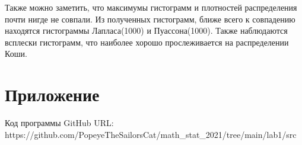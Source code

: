\documentclass[a4paper]{article}
\begin{document}
 
Также можно заметить, что максимумы гистограмм и плотностей распределения почти нигде не совпали. Из полученных гистограмм, ближе всего к совпадению находятся гистограммы Лапласа(1000) и Пуассона(1000). Также наблюдаются всплески гистограмм, что наиболее хорошо прослеживается на распределении Коши. 

\section{Приложение}

\noindent Код программы GitHub URL:\\
\newline https://github.com/PopeyeTheSailorsCat/math\_stat\_2021/tree/main/lab1/src
\end{document}
